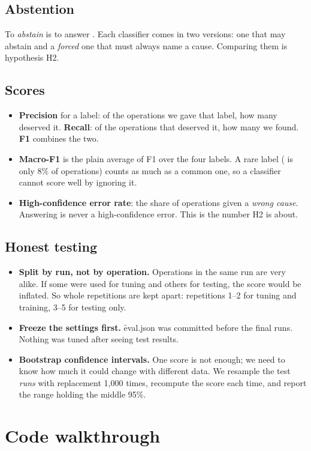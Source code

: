 \documentclass[11pt]{article}
\begin{document}
\subsection{Abstention}
To \emph{abstain} is to answer \IND. Each classifier comes in two versions: one that may abstain and a \emph{forced} one that must always name a cause. Comparing them is hypothesis H2.

\subsection{Scores}
\begin{itemize}
\item \textbf{Precision} for a label: of the operations we gave that label, how many deserved it. \textbf{Recall}: of the operations that deserved it, how many we found. \textbf{F1} combines the two.
\item \textbf{Macro-F1} is the plain average of F1 over the four labels. A rare label (\SCH{} is only 8\% of operations) counts as much as a common one, so a classifier cannot score well by ignoring it.
\item \textbf{High-confidence error rate}: the share of operations given a \emph{wrong cause}. Answering \IND{} is never a high-confidence error. This is the number H2 is about.
\end{itemize}

\subsection{Honest testing}
\begin{itemize}
\item \textbf{Split by run, not by operation.} Operations in the same run are very alike. If some were used for tuning and others for testing, the score would be inflated. So whole repetitions are kept apart: repetitions 1--2 for tuning and training, 3--5 for testing only.
\item \textbf{Freeze the settings first.} \f{eval.json} was committed before the final runs. Nothing was tuned after seeing test results.
\item \textbf{Bootstrap confidence intervals.} One score is not enough; we need to know how much it could change with different data. We resample the test \emph{runs} with replacement 1{,}000 times, recompute the score each time, and report the range holding the middle 95\%.
\end{itemize}

\section{Code walkthrough}
\end{document}
